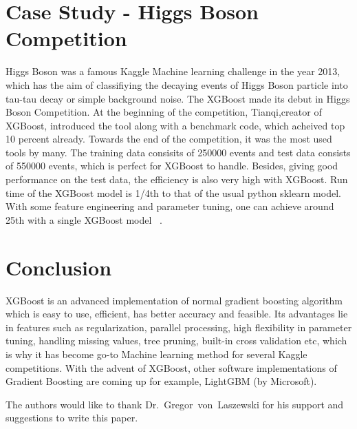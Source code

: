 \section{Case Study - Higgs Boson Competition}

Higgs Boson was a famous Kaggle Machine learning challenge in the year 2013,
which has the  aim of classifiying the decaying events of Higgs Boson particle
into tau-tau decay or simple  background noise. The XGBoost made its debut in
Higgs Boson Competition. At the beginning of  the competition, Tianqi,creator of
XGBoost, introduced the tool along with a benchmark code,  which acheived top 10
percent already. Towards the end of the competition, it was the most used tools
by many.
The training data consisits of 250000 events and test data consists of
550000 events, which is perfect for XGBoost to handle. Besides, giving good
performance on the test data, the efficiency is also very high with XGBoost. Run
time of the XGBoost model is 1/4th to that of the usual python sklearn model.
With some feature engineering and parameter tuning, one can achieve around 25th
with a single XGBoost model ~\cite{hid-sp18-401-XGBoost-pdf}.

\section{Conclusion} 

 XGBoost is an advanced implementation of normal gradient boosting algorithm 
 which is easy to use, efficient, has better accuracy and feasible. Its 
 advantages lie in features such as regularization, parallel processing, high 
 flexibility in parameter tuning, handling missing values, tree pruning, 
 built-in cross validation etc, which is why it has become go-to Machine 
 learning method for several Kaggle competitions. With the advent of XGBoost, 
 other software implementations of Gradient Boosting are coming up for example, 
 LightGBM (by Microsoft).

\begin{acks}

  The authors would like to thank Dr.~Gregor~von~Laszewski for his
  support and suggestions to write this paper.

\end{acks}


 

